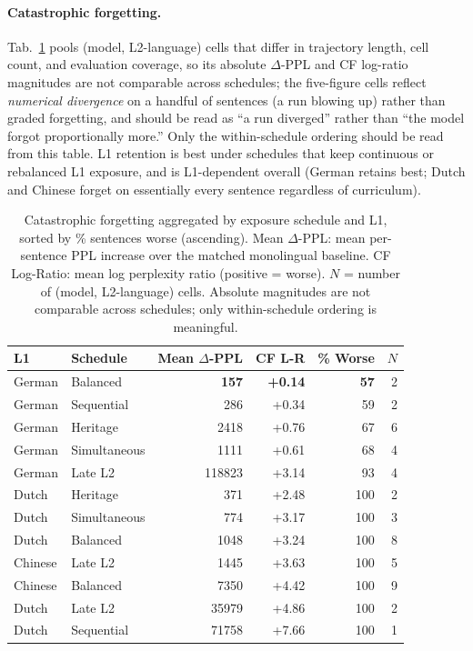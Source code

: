 \paragraph{Catastrophic forgetting.} Tab.~\ref{tab:forgetting} pools (model, L2-language) cells that differ in trajectory length, cell count, and evaluation coverage, so its absolute $\Delta$-PPL and CF log-ratio magnitudes are not comparable across schedules; the five-figure cells reflect \emph{numerical divergence} on a handful of sentences (a run blowing up) rather than graded forgetting, and should be read as ``a run diverged'' rather than ``the model forgot proportionally more.'' Only the within-schedule ordering should be read from this table. L1 retention is best under schedules that keep continuous or rebalanced L1 exposure, and is L1-dependent overall (German retains best; Dutch and Chinese forget on essentially every sentence regardless of curriculum).
 
\begin{table}[!ht]
  \centering \small
  \caption{Catastrophic forgetting aggregated by exposure schedule and L1, sorted by \% sentences worse (ascending). Mean $\Delta$-PPL: mean per-sentence PPL increase over the matched monolingual baseline. CF Log-Ratio: mean log perplexity ratio (positive = worse). $N$ = number of (model, L2-language) cells. Absolute magnitudes are not comparable across schedules; only within-schedule ordering is meaningful.}
  \label{tab:forgetting}
  \begin{tabular}{llrrrr}
    \toprule
    L1 & Schedule & Mean $\Delta$-PPL & CF L-R & \% Worse & $N$ \\
    \midrule
    German  & Balanced     & \textbf{157} & \textbf{+0.14} & \textbf{57} & 2 \\
    German  & Sequential   & 286   & +0.34 & 59  & 2 \\
    German  & Heritage     & 2418  & +0.76 & 67  & 6 \\
    German  & Simultaneous & 1111  & +0.61 & 68  & 4 \\
    German  & Late L2      & 118823 & +3.14 & 93 & 4 \\
    Dutch   & Heritage     & 371   & +2.48 & 100 & 2 \\
    Dutch   & Simultaneous & 774   & +3.17 & 100 & 3 \\
    Dutch   & Balanced     & 1048  & +3.24 & 100 & 8 \\
    Chinese & Late L2      & 1445  & +3.63 & 100 & 5 \\
    Chinese & Balanced     & 7350  & +4.42 & 100 & 9 \\
    Dutch   & Late L2      & 35979 & +4.86 & 100 & 2 \\
    Dutch   & Sequential   & 71758 & +7.66 & 100 & 1 \\
    \bottomrule
  \end{tabular}
\end{table}

